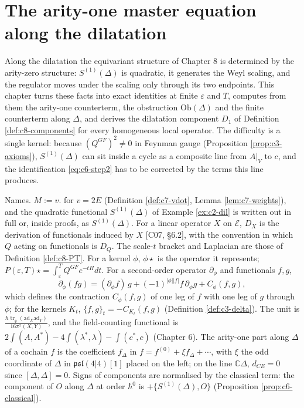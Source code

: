 \chapter{The arity-one master equation along the dilatation}

Along the dilatation the equivariant structure of Chapter 8 is determined by the arity-zero structure: $S^{(1)}(\Delta)$ is quadratic, it generates the Weyl scaling, and the regulator moves under the scaling only through its two endpoints. This chapter turns these facts into exact identities at finite $\varepsilon$ and $T$, computes from them the arity-one counterterm, the obstruction $\mathrm{Ob}(\Delta)$ and the finite counterterm along $\Delta$, and derives the dilatation component $D_1$ of Definition \ref{def:c8-components} for every homogeneous local operator. The difficulty is a single kernel: because $(Q^{GF})^2\neq0$ in Feynman gauge (Proposition \ref{prop:c3-axioms}), $S^{(1)}(\Delta)$ can sit inside a cycle as a composite line from $A|_V$ to $c$, and the identification \eqref{eq:c6-step2} has to be corrected by the terms this line produces.

Names. $M:=v.$ for $v=2E$ (Definition \ref{def:c7-vdot}, Lemma \ref{lem:c7-weights}), and the quadratic functional $S^{(1)}(\Delta)$ of Example \ref{ex:c2-dil} is written out in full or, inside proofs, as $S^{(1)}(\Delta)$. For a linear operator $X$ on $\mathscr E$, $D_X$ is the derivation of functionals induced by $X$ [C07, §6.2], with the convention in which $Q$ acting on functionals is $D_Q$. The scale-$t$ bracket and Laplacian are those of Definition \ref{def:c8-PT}. For a kernel $\phi$, $\phi\star$ is the operator it represents; $P(\varepsilon,T)\star=\int_\varepsilon^TQ^{GF}e^{-tH}dt$. For a second-order operator $\partial_\phi$ and functionals $f,g$,
\[
\partial_\phi(fg)=(\partial_\phi f)\,g+(-1)^{|\phi||f|}f\,\partial_\phi g+C_\phi(f,g),
\]
which defines the contraction $C_\phi(f,g)$ of one leg of $f$ with one leg of $g$ through $\phi$; for the kernels $K_t$, $\{f,g\}_t=-C_{K_t}(f,g)$ (Definition \ref{def:c3-delta}). The unit is $\frac{\hbar\operatorname{tr}_{\mathfrak g}(\mathrm{ad}_X\mathrm{ad}_Y)}{16\pi^2(X,Y)}$, and the field-counting functional is $2\int(A,A^*)-4\int(\lambda^*,\lambda)-\int(c^*,c)$ (Chapter 6). The arity-one part along $\Delta$ of a cochain $f$ is the coefficient $f_\Delta$ in $f=f^{(0)}+\xi f_\Delta+\cdots$, with $\xi$ the odd coordinate of $\Delta$ in $\mathfrak{psl}(4|4)[1]$ placed on the left; on the line $\mathbb C\Delta$, $d_{CE}=0$ since $[\Delta,\Delta]=0$. Signs of components are normalised by the classical term: the component of $O$ along $\Delta$ at order $\hbar^0$ is $+\{S^{(1)}(\Delta),O\}$ (Proposition \ref{prop:c6-classical}).

